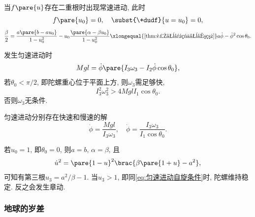 \documentclass[../TheoreticalMechanics.tex]{subfiles}
\begin{document}
\begin{corollary}[匀速进动的条件]
    当$f\pare{u}$存在二重根时出现常速进动, 此时
    \[ f\pare{u_0} = 0,\quad \subst{\+dudf}{u=u_0} = 0, \]
    \[ \frac{\beta}{2} = \frac{a\pare{b - au_0}}{1-u_0^2} - u_0\frac{\pare{\alpha - \beta u_0}}{1-u_0^2} \xlongequal{\text{\cref{thm:进动对章动关系}}} a\dot{\phi} - \dot{\phi}^2 \cos\theta_0. \]
\end{corollary}
\begin{finale}
    \begin{corollary}[匀速进动的自旋角速度]
        发生匀速进动时
        \[ Mgl = \dot{\phi}\pare{I_3 \omega_3 - I_2\dot{\phi}\cos\theta_0}, \]
        若$\theta_0<\pi/2$, 即陀螺重心位于平面上方, 则$\omega_3$需足够快,
        \begin{equation}
            \label{eq:匀速进动自旋条件}
            I_3^2\omega_3^2 > 4MglI_1\cos\theta_0. 
        \end{equation}
        否则$\omega_3$无条件.
    \end{corollary}
\end{finale}
\begin{corollary}[匀速进动角速度]
    匀速进动分别存在快速和慢速的解
    \begin{equation}
        \label{eq:匀速进动角速度}
         \dot{\phi} = \frac{Mgl}{I_3\omega_3},\quad \dot{\phi} = \frac{I_3\omega_3}{I_1\cos\theta_0}. 
    \end{equation}
\end{corollary}
\begin{corollary}[垂直陀螺]
    若$u_0=1$, 即$\theta_0=0$, 则$a=b$, $\alpha=\beta$, 且
    \[ \dot{u}^2 = \pare{1-u}^2\brac{\beta\pare{1+u}-a^2}, \]
    可知有第三根$u_3 = a^2/\beta - 1$. 当$u_3>1$, 即同\eqref{eq:匀速进动自旋条件}时, 陀螺维持稳定. 反之会发生章动.
\end{corollary}


\subsubsection{地球的岁差} %
\label{ssub:地球的岁差}
\end{document}
